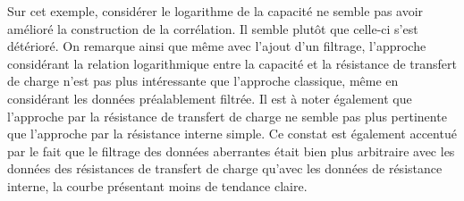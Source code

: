 \FloatBarrier
Sur cet exemple, considérer le logarithme de la capacité ne semble pas avoir amélioré la construction de la corrélation. Il semble plutôt que celle-ci s'est détérioré. 
On remarque ainsi que même avec l'ajout d'un filtrage, l'approche considérant la relation logarithmique entre la capacité et la résistance de transfert de charge n'est pas plus intéressante que l'approche classique, même en considérant les données préalablement filtrée. Il est à noter également que l'approche par la résistance de transfert de charge ne semble pas plus pertinente que l'approche par la résistance interne simple. Ce constat est également accentué par le fait que le filtrage des données aberrantes était bien plus arbitraire avec les données des résistances de transfert de charge qu'avec les données de résistance interne, la courbe présentant moins de tendance claire. 

